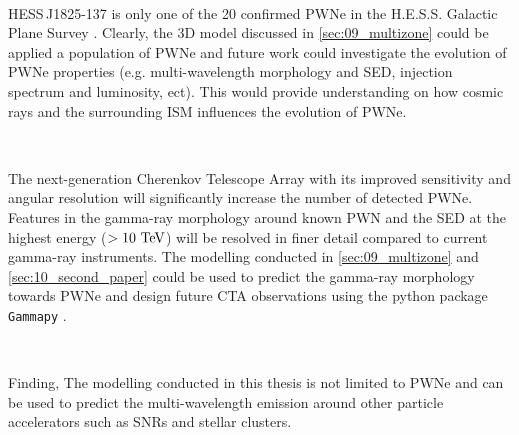 \par~\par
\mbox{HESS\,J1825-137} is only one of the 20 confirmed PWNe in the H.E.S.S. Galactic Plane Survey \citep{2018A&A...612A...1H}. Clearly, the 3D model discussed in \autoref{sec:09_multizone} could be applied a population of PWNe and future work could investigate the evolution of PWNe properties (e.g. multi-wavelength morphology and SED, injection spectrum and luminosity, ect). This would provide understanding on how cosmic rays and the surrounding ISM influences the evolution of PWNe.
\par~\par
The next-generation Cherenkov Telescope Array with its improved sensitivity and angular resolution \citep{2019scta.book.....C} will significantly increase the number of detected PWNe. Features in the gamma-ray morphology around known PWN and the SED at the highest energy ($>10~\TeV$) will be resolved in finer detail compared to current gamma-ray instruments. The modelling conducted in \autoref{sec:09_multizone} and \autoref{sec:10_second_paper} could be used to predict the gamma-ray morphology towards PWNe and design future CTA observations using the python package {\tt Gammapy} \citep{gammapy:2017}.
\par~\par 
Finding, The modelling conducted in this thesis is not limited to PWNe and can be used to predict the multi-wavelength emission around other particle accelerators such as SNRs and stellar clusters.